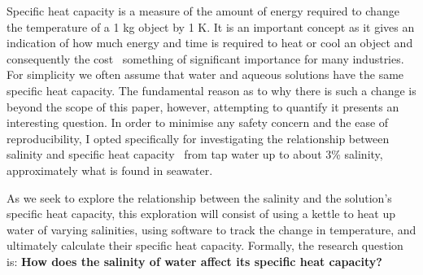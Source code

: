 Specific heat capacity is a measure of the amount of energy required to change the temperature of a 1 kg object by 1 K. 
It is an important concept as it gives an indication of how much energy and time is required to heat or cool an object and consequently the cost \textendash\ something of significant importance for many industries. 
For simplicity we often assume that water and aqueous solutions have the same specific heat capacity. 
The fundamental reason as to why there is such a change is beyond the scope of this paper, however, attempting to quantify it presents an interesting question. 
In order to minimise any safety concern and the ease of reproducibility, I opted specifically for investigating the relationship between salinity and specific heat capacity \textendash\ from tap water up to about 3\% salinity, approximately what is found in seawater.

As we seek to explore the relationship between the salinity and the solution’s specific heat capacity, this exploration will consist of using a kettle to heat up water of varying salinities, using software to track the change in temperature, and ultimately calculate their specific heat capacity. Formally, the research question is: \textbf{How does the salinity of water affect its specific heat capacity?}